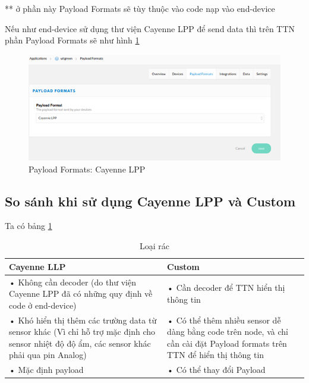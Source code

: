 ** ở phần này Payload Formats sẽ tùy thuộc vào code nạp vào end-device

Nếu như end-device sử dụng thư viện Cayenne LPP để send data thì trên TTN phần Payload Formats sẽ như hình \ref{fig:payload_format}
\begin{figure}[H]
    \centering
    \includegraphics[width=\textwidth]{images/Quanh/Payload_format.png}
    \caption{Payload Formats: Cayenne LPP}
    \label{fig:payload_format}
\end{figure}

\subsection{So sánh khi sử dụng Cayenne LPP và Custom}

Ta có bảng \ref{tab.comparison.Cayenne}

\begin{table}[H]
    \centering
    \caption{Loại rác} 
    \label{tab.comparison.Cayenne}
    \begin{tabular}{| m{6cm} | m{6cm} |}
        \hline
        Cayenne LLP & Custom \\

        \hline
        •	Không cần decoder (do thư viện Cayenne LPP đã có những quy định về code ở end-device) & •	Cần decoder để TTN hiển thị thông tin \\
        •	Khó hiển thị thêm các trường data từ sensor khác (Vì chỉ  hỗ trợ mặc định cho sensor nhiệt độ độ ẩm, các sensor khác phải qua pin Analog) & •	Có thể thêm nhiều sensor dễ dàng bằng code trên node, và chỉ cần cài đặt Payload formats trên TTN để hiển thị thông tin \\
        •	Mặc định payload & •	Có thể thay đổi Payload \\
        
        \hline
    \end{tabular}
\end{table}

